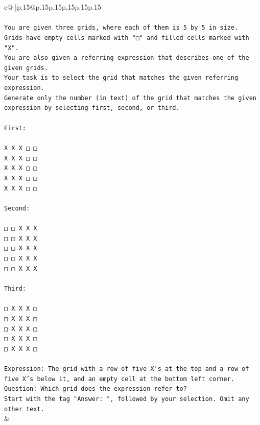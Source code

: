 \documentclass{article}
\begin{document}
{\begin{supertabular}{c@{$\;$}|p{.15\linewidth}@{}p{.15\linewidth}p{.15\linewidth}p{.15\linewidth}p{.15\linewidth}p{.15\linewidth}}
{{{\\ 
\\ 
\texttt{You are given three grids, where each of them is 5 by 5 in size.} \\
\texttt{Grids have empty cells marked with "▢" and filled cells marked with "X".} \\
\texttt{You are also given a referring expression that describes one of the given grids.} \\
\texttt{Your task is to select the grid that matches the given referring expression.} \\
\texttt{Generate only the number (in text) of the grid that matches the given expression by selecting first, second, or third.} \\
\\ 
\texttt{First:} \\
\\ 
\texttt{X X X □ □} \\
\texttt{X X X □ □} \\
\texttt{X X X □ □} \\
\texttt{X X X □ □} \\
\texttt{X X X □ □} \\
\\ 
\texttt{Second:} \\
\\ 
\texttt{□ □ X X X} \\
\texttt{□ □ X X X} \\
\texttt{□ □ X X X} \\
\texttt{□ □ X X X} \\
\texttt{□ □ X X X} \\
\\ 
\texttt{Third:} \\
\\ 
\texttt{□ X X X □} \\
\texttt{□ X X X □} \\
\texttt{□ X X X □} \\
\texttt{□ X X X □} \\
\texttt{□ X X X □} \\
\\ 
\texttt{Expression: The grid with a row of five X's at the top and a row of five X's below it, and an empty cell at the bottom left corner.} \\
\texttt{Question: Which grid does the expression refer to?} \\
\texttt{Start with the tag "Answer: ", followed by your selection. Omit any other text.} \\
            }
        }
    }
    & \\ \\


\end{supertabular}}
\end{document}

